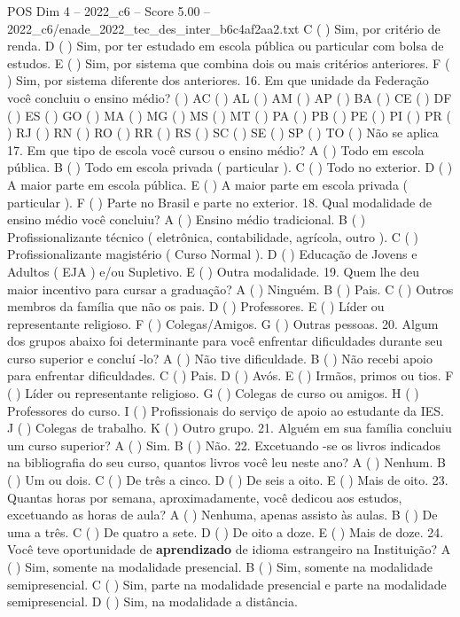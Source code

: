 \begin{textsample}{POS Dim 4 – 2022\_c6 – Score 5.00 – 2022\_c6/enade\_2022\_tec\_des\_inter\_b6c4af2aa2.txt}
C ( ) Sim, por critério de renda.
D ( ) Sim, por ter estudado em escola pública ou particular com bolsa de estudos.
E ( ) Sim, por sistema que combina dois ou mais critérios anteriores.
F ( ) Sim, por sistema diferente dos anteriores. 16.
Em que unidade da Federação você concluiu o ensino médio? ( ) AC ( ) AL ( ) AM ( ) AP ( ) BA ( ) CE ( ) DF ( ) ES ( ) GO ( ) MA ( ) MG ( ) MS ( ) MT ( ) PA ( ) PB ( ) PE ( ) PI ( ) PR ( ) RJ ( ) RN ( ) RO ( ) RR ( ) RS ( ) SC ( ) SE ( ) SP ( ) TO ( ) Não se aplica 17.
Em que tipo de escola você cursou o ensino médio?
A ( ) Todo em escola pública.
B ( ) Todo em escola privada ( particular ).
C ( ) Todo no exterior.
D ( ) A maior parte em escola pública.
E ( ) A maior parte em escola privada ( particular ).
F ( ) Parte no Brasil e parte no exterior. 18.
Qual modalidade de ensino médio você concluiu?
A ( ) Ensino médio tradicional.
B ( ) Profissionalizante técnico ( eletrônica, contabilidade, agrícola, outro ).
C ( ) Profissionalizante magistério ( Curso Normal ).
D ( ) Educação de Jovens e Adultos ( EJA ) e/ou Supletivo.
E ( ) Outra modalidade. 19.
Quem lhe deu maior incentivo para cursar a graduação?
A ( ) Ninguém.
B ( ) Pais.
C ( ) Outros membros da família que não os pais.
D ( ) Professores.
E ( ) Líder ou representante religioso.
F ( ) Colegas/Amigos.
G ( ) Outras pessoas. 20.
Algum dos grupos abaixo foi determinante para você enfrentar dificuldades durante seu curso superior e concluí -lo?
A ( ) Não tive dificuldade.
B ( ) Não recebi apoio para enfrentar dificuldades.
C ( ) Pais.
D ( ) Avós.
E ( ) Irmãos, primos ou tios.
F ( ) Líder ou representante religioso.
G ( ) Colegas de curso ou amigos.
H ( ) Professores do curso.
I ( ) Profissionais do serviço de apoio ao estudante da IES.
J ( ) Colegas de trabalho.
K ( ) Outro grupo. 21.
Alguém em sua família concluiu um curso superior?
A ( ) Sim.
B ( ) Não. 22.
Excetuando -se os livros indicados na bibliografia do seu curso, quantos livros você leu neste ano?
A ( ) Nenhum.
B ( ) Um ou dois.
C ( ) De três a cinco.
D ( ) De seis a oito.
E ( ) Mais de oito. 23.
Quantas horas por semana, aproximadamente, você dedicou aos estudos, excetuando as horas de aula?
A ( ) Nenhuma, apenas assisto às aulas.
B ( ) De uma a três.
C ( ) De quatro a sete.
D ( ) De oito a doze.
E ( ) Mais de doze. 24.
Você teve oportunidade de \textbf{aprendizado} de idioma estrangeiro na Instituição?
A ( ) Sim, somente na modalidade presencial.
B ( ) Sim, somente na modalidade semipresencial.
C ( ) Sim, parte na modalidade presencial e parte na modalidade semipresencial.
D ( ) Sim, na modalidade a distância.

\end{textsample}

